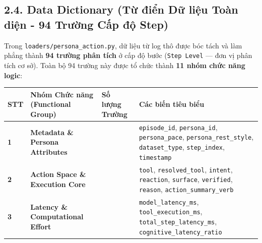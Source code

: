 \documentclass[11pt]{article}
\newcounter{none}
\begin{document}
    
    \subsection{2.4. Data Dictionary (Từ điển Dữ liệu Toàn diện - 94 Trường
Cấp độ
Step)}\label{data-dictionary-tux1eeb-ux111iux1ec3n-dux1eef-liux1ec7u-touxe0n-diux1ec7n---94-trux1b0ux1eddng-cux1ea5p-ux111ux1ed9-step}

Trong \texttt{loaders/persona\_action.py}, dữ liệu từ log thô được bóc
tách và làm phẳng thành \textbf{94 trường phân tích} ở cấp độ bước
(\texttt{Step\ Level} --- đơn vị phân tích cơ sở). Toàn bộ 94 trường này
được tổ chức thành \textbf{11 nhóm chức năng logic}:

{\def\LTcaptype{none} %
\begin{longtable}[]{@{}
  >{\centering\arraybackslash}p{}
  >{\raggedright\arraybackslash}p{}
  >{\centering\arraybackslash}p{}
  >{\raggedright\arraybackslash}p{}@{}}
\toprule\noalign{}
\begin{minipage}[b]{\linewidth}\centering
STT
\end{minipage} & \begin{minipage}[b]{\linewidth}\raggedright
Nhóm Chức năng (Functional Group)
\end{minipage} & \begin{minipage}[b]{\linewidth}\centering
Số lượng Trường
\end{minipage} & \begin{minipage}[b]{\linewidth}\raggedright
Các biến tiêu biểu
\end{minipage} \\
\midrule\noalign{}
\endhead
\bottomrule\noalign{}
\endlastfoot
\textbf{1} & \textbf{Metadata \& Persona Attributes} & 8 &
\texttt{episode\_id}, \texttt{persona\_id}, \texttt{persona\_pace},
\texttt{persona\_rest\_style}, \texttt{dataset\_type},
\texttt{step\_index}, \texttt{timestamp} \\
\textbf{2} & \textbf{Action Space \& Execution Core} & 14 &
\texttt{tool}, \texttt{resolved\_tool}, \texttt{intent},
\texttt{reaction}, \texttt{surface}, \texttt{verified}, \texttt{reason},
\texttt{action\_summary\_verb} \\
\textbf{3} & \textbf{Latency \& Computational Effort} & 5 &
\texttt{model\_latency\_ms}, \texttt{tool\_execution\_ms},
\texttt{total\_step\_latency\_ms}, \texttt{cognitive\_latency\_ratio} \\

\end{longtable}}
\end{document}
